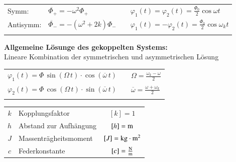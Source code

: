 \begin{tabular}{llll}
Symm: & $\ddot{\Phi_+} = - \omega^2 \Phi_+ $ & \quad &  $\varphi_1(t) = \varphi_2(t) = \frac{\Phi_0}{2} \cos{ \omega t} $\\
Antisymm: & $\ddot{\Phi_-} = - (\omega^2 + 2k) \Phi_- $ & \quad & $\varphi_1(t) = -\varphi_2(t) = \frac{\Phi_0}{2} \cos{ \omega_k t} $ \\
\\
\end{tabular}





\textbf{Allgemeine Lösunge des gekoppelten Systems:} \\
Lineare Kombination der symmetrischen und asymmetrischen Lösung \\

\renewcommand{\arraystretch}{1.3}
\begin{tabular}{lll}
$\varphi_1(t) = \Phi \, \sin( \Omega\, t) \cdot \cos(\overline{\omega} \, t)$ & & $\Omega = \frac{\omega_k - \omega}{2}$ \\
$\varphi_2(t) = \Phi \, \cos( \Omega\, t) \cdot \sin(\overline{\omega} \, t)$ & & $\overline{\omega} = \frac{\omega + \omega_k}{2}$ \\
\\
\end{tabular}
\renewcommand{\arraystretch}{1}


\begin{tabular}{c l c}
$k$ & Kopplungsfaktor & $[k] = 1$ \\
$h$ & Abstand zur Aufhängung & $[h] = \mathrm{m}$ \\
$J$ & Massenträgheitsmoment & $[J] = \mathrm{kg} \cdot \mathrm{m}^2 $ \\
$c$ & Federkonstante & $[c] = \frac{\mathrm{N}}{\mathrm{m}}$ \\
\end{tabular}


